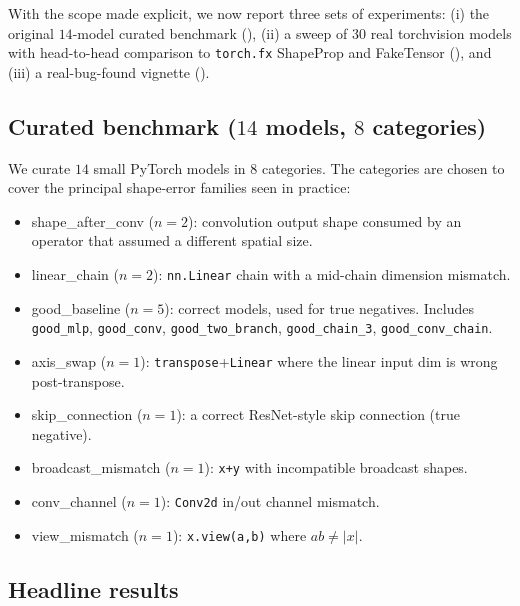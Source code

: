\documentclass{article}
\theoremstyle{definition}
\begin{document}
With the scope made explicit, we now report three sets of
experiments: (i) the original $14$-model curated benchmark
(), (ii) a sweep of $30$ real torchvision
models with head-to-head comparison to \verb|torch.fx| ShapeProp
and FakeTensor (), and (iii) a
real-bug-found vignette ().

\subsection{Curated benchmark ($14$ models, $8$ categories)}\label{sec:benchmark}

We curate $14$ small PyTorch models in $8$ categories. The categories
are chosen to cover the principal shape-error families seen in
practice:

\begin{itemize}\itemsep0pt
\item \textsf{shape\_after\_conv} ($n=2$): convolution output shape
      consumed by an operator that assumed a different spatial size.
\item \textsf{linear\_chain} ($n=2$): \verb|nn.Linear| chain with a
      mid-chain dimension mismatch.
\item \textsf{good\_baseline} ($n=5$): correct models, used for true
      negatives. Includes \verb|good_mlp|, \verb|good_conv|,
      \verb|good_two_branch|, \verb|good_chain_3|, \verb|good_conv_chain|.
\item \textsf{axis\_swap} ($n=1$): \verb|transpose|+\verb|Linear| where
      the linear input dim is wrong post-transpose.
\item \textsf{skip\_connection} ($n=1$): a correct ResNet-style skip
      connection (true negative).
\item \textsf{broadcast\_mismatch} ($n=1$): \verb|x+y| with
      incompatible broadcast shapes.
\item \textsf{conv\_channel} ($n=1$): \verb|Conv2d| in/out channel
      mismatch.
\item \textsf{view\_mismatch} ($n=1$): \verb|x.view(a,b)| where
      $ab\ne|x|$.
\end{itemize}

\subsection{Headline results}\label{sec:headline}
\end{document}
